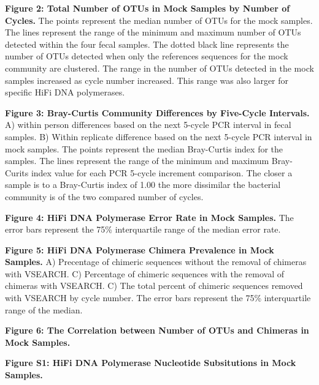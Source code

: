 \documentclass[11pt,]{article}
\begin{document}
\textbf{Figure 2: Total Number of OTUs in Mock Samples by Number of
Cycles.} The points represent the median number of OTUs for the mock
samples. The lines represent the range of the minimum and maximum number
of OTUs detected within the four fecal samples. The dotted black line
represents the number of OTUs detected when only the references
sequences for the mock community are clustered. The range in the number
of OTUs detected in the mock samples increased as cycle number
increased. This range was also larger for specific HiFi DNA polymerases.

\textbf{Figure 3: Bray-Curtis Community Differences by Five-Cycle
Intervals.} A) within person differences based on the next 5-cycle PCR
interval in fecal samples. B) Within replicate difference based on the
next 5-cycle PCR interval in mock samples. The points represent the
median Bray-Curtis index for the samples. The lines represent the range
of the minimum and maximum Bray-Curits index value for each PCR 5-cycle
increment comparison. The closer a sample is to a Bray-Curtis index of
1.00 the more dissimilar the bacterial community is of the two compared
number of cycles.

\textbf{Figure 4: HiFi DNA Polymerase Error Rate in Mock Samples.} The
error bars represent the 75\% interquartile range of the median error
rate.

\textbf{Figure 5: HiFi DNA Polymerase Chimera Prevalence in Mock
Samples.} A) Precentage of chimeric sequences without the removal of
chimeras with VSEARCH. C) Percentage of chimeric sequences with the
removal of chimeras with VSEARCH. C) The total percent of chimeric
sequences removed with VSEARCH by cycle number. The error bars represent
the 75\% interquartile range of the median.

\textbf{Figure 6: The Correlation between Number of OTUs and Chimeras in
Mock Samples.}

\newpage

\textbf{Figure S1: HiFi DNA Polymerase Nucleotide Subsitutions in Mock
Samples.}
\end{document}
